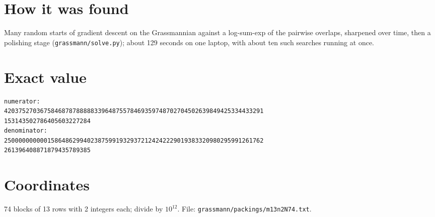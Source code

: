 \documentclass[11pt,a4paper]{article}
\begin{document}
\section{How it was found}
Many random starts of gradient descent on the Grassmannian against a log-sum-exp of the pairwise overlaps, sharpened over time, then a polishing stage (\texttt{grassmann/solve.py}); about 129 seconds on one laptop, with about ten such searches running at once.


\appendix
\section{Exact value}
{\small
\begin{verbatim}
numerator:
420375270367584687878888833964875578469359748702704502639849425334433291
153143502786405603227284
denominator:
250000000000158648629940238759919329372124242229019383320980295991261762
261396408871879435789385
\end{verbatim}}

\section{Coordinates}
74 blocks of 13 rows with 2 integers each; divide by $10^{12}$. File: \texttt{grassmann/packings/m13n2N74.txt}.
{\tiny
\begin{multicols}{4}
\end{multicols}}
\end{document}
